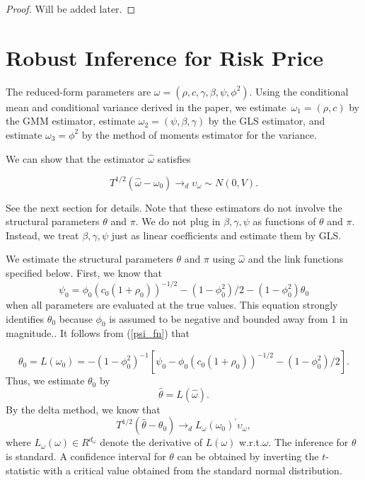 \documentclass[11pt, letterpaper, twoside, final]{article}
\begin{document}
\begin{proof}
    Will be added later.
\end{proof}


\section{Robust Inference for Risk Price}

The reduced-form parameters are $\omega  = (\rho ,c,\gamma ,\beta ,\psi ,\phi ^{2})$. 
Using the conditional mean and conditional variance derived in the paper, we estimate $\, \omega_{1} = (\rho ,c)$
by the GMM estimator, estimate $\omega_{2} = (\psi ,\beta ,\gamma )$ by the GLS estimator, and estimate
$\omega_{3} = \phi^{2}$ by the method of moments estimator for the variance.

We can show that the estimator $\widehat{\omega}$ satisfies

\begin{equation}
    T^{1/2}(\widehat{\omega}-\omega_{0})\rightarrow_{d}\upsilon_{\omega}\sim N(0,V).
\end{equation}%

See the next section for details. 
Note that these estimators do not involve the structural parameters $\theta $ and $\pi$.
We do not plug in $\beta ,\gamma ,\psi $ as functions of $\theta $ and $\pi .$ Instead, we treat $\beta ,\gamma
,\psi $ just as linear coefficients and estimate them by GLS.

We estimate the structural parameters $\theta $ and $\pi $ using $\widehat{ \omega}$ and the link functions
specified below. 
First, we know that
%
\begin{equation}
    \label{psi_fn} 
    \psi_{0}=\phi_{0}\left( c_{0}\left( 1+\rho_{0}\right) \right) ^{-1/2} - \left( 1-\phi_{0}^{2}\right)
    /2-(1-\phi_{0}^{2})\theta_{0}
\end{equation}
%
when all parameters are evaluated at the true values. 
This equation strongly identifies $\theta_{0}$ because $\phi_{0}$ is assumed to be negative and bounded away from
1 in magnitude.. 
It follows from (\cref{psi_fn}) that

\begin{equation}
    \theta_{0} = L(\omega_{0})=-(1-\phi_{0}^{2})^{-1}\left[ \psi_{0}-\phi_{0}\left( c_{0}\left( 1+\rho_{0}\right)
    \right)^{-1/2}-\left( 1-\phi_{0}^{2}\right) /2\right] .
\end{equation}
%
Thus, we estimate $\theta_{0}$ by
%
\begin{equation}
    \widehat{\theta}=L(\widehat{\omega}).
\end{equation}
%
By the delta method, we know that
%
\begin{equation}
    T^{1/2}(\widehat{\theta}-\theta_{0})\rightarrow_{d}L_{\omega}(\omega_{0})^{\prime}\upsilon_{\omega},
\end{equation}
%
where $L_{\omega}(\omega )\in R^{d_{\omega}}$ denote the derivative of $L(\omega )$ w.r.t.\@ $\omega$. 
The inference for $\theta $ is standard. 
A confidence interval for $\theta $ can be obtained by inverting the $t$-statistic with a critical value obtained
from the standard normal distribution.
\end{document}
